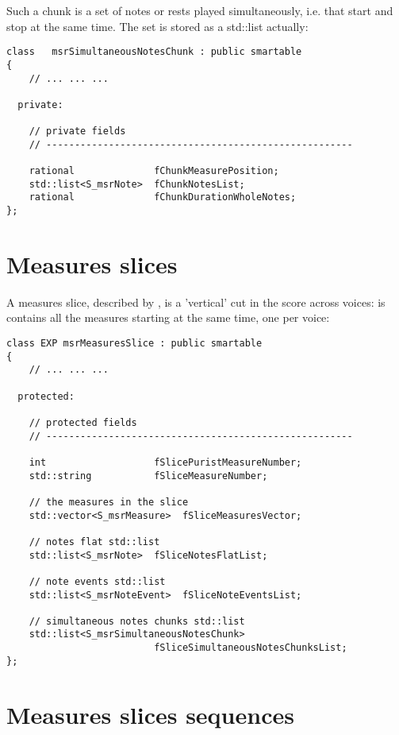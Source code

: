 Such a chunk is a set of notes or rests played simultaneously, i.e. that start and stop at the same time. The set is stored as a std::list actually:
\begin{lstlisting}[language=CPlusPlus]
class   msrSimultaneousNotesChunk : public smartable
{
	// ... ... ...

  private:

    // private fields
    // ------------------------------------------------------

    rational              fChunkMeasurePosition;
    std::list<S_msrNote>  fChunkNotesList;
    rational              fChunkDurationWholeNotes;
};
\end{lstlisting}


\section{Measures slices}

A measures slice, described by , is a 'vertical' cut in the score across voices: is contains all the measures starting at the same time, one per voice:
\begin{lstlisting}[language=CPlusPlus]
class EXP msrMeasuresSlice : public smartable
{
	// ... ... ...

  protected:

    // protected fields
    // ------------------------------------------------------

    int                   fSlicePuristMeasureNumber;
    std::string           fSliceMeasureNumber;

    // the measures in the slice
    std::vector<S_msrMeasure>  fSliceMeasuresVector;

    // notes flat std::list
    std::list<S_msrNote>  fSliceNotesFlatList;

    // note events std::list
    std::list<S_msrNoteEvent>  fSliceNoteEventsList;

    // simultaneous notes chunks std::list
    std::list<S_msrSimultaneousNotesChunk>
                          fSliceSimultaneousNotesChunksList;
};

\end{lstlisting}


\section{Measures slices sequences}


